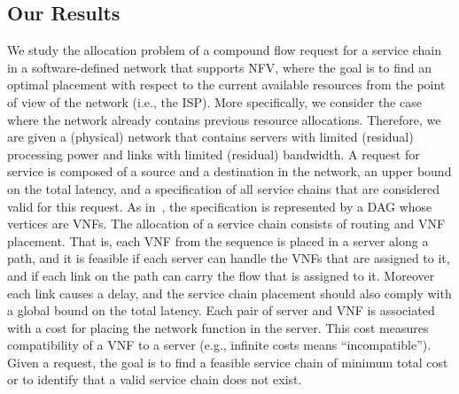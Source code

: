 \documentclass[11pt]{article}
\begin{document}

\subsection{Our Results}

We study the allocation problem of a compound flow request for a
service chain in a software-defined network that supports NFV, where
the goal is to find an optimal placement with respect to the current
available resources from the point of view of the network (i.e., the
ISP).
%
More specifically, we consider the case where the network already
contains previous resource allocations.  Therefore, we are given a
(physical) network that contains servers with limited (residual)
processing power and links with limited (residual) bandwidth.
%
A request for service is composed of a source and a destination in the
network, an upper bound on the total latency, and a specification of
all service chains that are considered valid for this request.  As
in~\cite{EMP16}, the specification is represented by a DAG whose
vertices are VNFs.
%
The allocation of a service chain consists of routing and VNF
placement.  That is, each VNF from the sequence is placed in a server
along a path, and it is feasible if each server can handle the VNFs
that are assigned to it, and if each link on the path can carry the
flow that is assigned to it.  Moreover each link causes a delay, and
the service chain placement should also comply with a global bound on
the total latency.
%
Each pair of server and VNF is associated with a cost for placing the
network function in the server.  This cost measures compatibility of a
VNF to a server (e.g., infinite costs means ``incompatible'').  Given
a request, the goal is to find a feasible service chain of minimum
total cost or to identify that a valid service chain does not exist.
\end{document}
